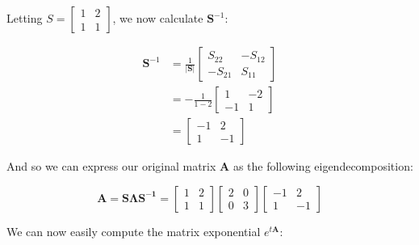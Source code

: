 \documentclass{article}
\begin{document}
Letting $S=\begin{bmatrix} 1&2\\1&1\end{bmatrix}$, we now calculate $\mathbf{S}^{-1}$:

\begin{align*}
    \mathbf{S}^{-1}&=\frac{1}{|\mathbf{S}|}\begin{bmatrix} S_{22}&-S_{12}\\-S_{21}&S_{11}\end{bmatrix}\\
    &=-\frac{1}{1-2}\begin{bmatrix} 1&-2\\-1&1\end{bmatrix}\\
    &=\begin{bmatrix} -1&2\\1&-1\end{bmatrix}
\end{align*}

And so we can express our original matrix $\mathbf{A}$ as the following eigendecomposition:

\begin{equation*}
    \mathbf{A}=\mathbf{S\Lambda S^{-1}}=\begin{bmatrix} 1&2\\1&1\end{bmatrix}\begin{bmatrix} 2&0\\0&3\end{bmatrix}\begin{bmatrix} -1&2\\1&-1\end{bmatrix}
\end{equation*}

We can now easily compute the matrix exponential $e^{t\mathbf{A}}$:
\end{document}
